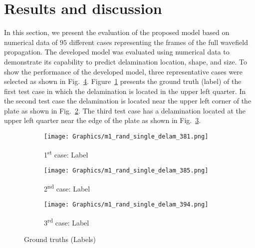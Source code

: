\documentclass{IOS-Book-Article}
\begin{document}
\section{Results and discussion}
In this section, we present the evaluation of the proposed model based on numerical data of \(95\) different cases representing the frames of the full wavefield propagation.
The developed model was evaluated using numerical data to demonstrate its capability to predict delamination location, shape, and size.
To show the performance of the developed model, three representative cases were selected as shown in Fig.~\ref{fig:GT}.
Figure~\ref{fig:num_GT_381} presents the ground truth (label) of the first test case in which the delamination is located in the upper left quarter.
In the second test case the delamination is located near the upper left corner of the plate as shown in Fig.~\ref{fig:num_GT_385}.
The third test case has a delamination located at the upper left quarter near the edge of the plate as shown in Fig.~\ref{fig:num_GT_394}.
\begin{figure}[ht!]
	\begin{subfigure}[b]{0.32\textwidth}
		\centering
		\texttt{[image: Graphics/m1\_rand\_single\_delam\_381.png]}
		\caption{1\textsuperscript{st} case: Label}
		\label{fig:num_GT_381}
	\end{subfigure}
	\hfill
	\begin{subfigure}[b]{0.32\textwidth}
		\centering
		\texttt{[image: Graphics/m1\_rand\_single\_delam\_385.png]}
		\caption{2\textsuperscript{nd} case: Label}
		\label{fig:num_GT_385}
	\end{subfigure}
	\hfill
	\begin{subfigure}[b]{0.32\textwidth}
		\centering
		\texttt{[image: Graphics/m1\_rand\_single\_delam\_394.png]}
		\caption{3\textsuperscript{rd} case: Label}
		\label{fig:num_GT_394}
	\end{subfigure}
	\caption{Ground truths (Labels)}
	\label{fig:GT}
\end{figure}
\end{document}
